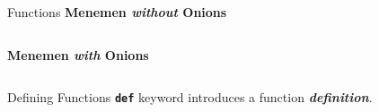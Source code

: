         \begin{frame}[c]{Functions}
            \large
            \textbf{Menemen \textit{without} Onions}
            \normalsize
            \inputminted[firstline=1, lastline=4, frame=single,framesep=2pt]{python3}{code-examples/menemen.py}
            \pause
            \large
            \textbf{Menemen \textit{with} Onions}
            \normalsize
            \inputminted[firstline=6, lastline=11, frame=single,framesep=2pt]{python3}{code-examples/menemen.py}
            \pause
            \begin{center}
            \end{center}
        \end{frame} 

        \begin{frame}{Defining Functions}
            \LARGE
            \textbf{\texttt{def}} keyword introduces a function \textbf{\textit{definition}}.
            \large
            \inputminted[firstline=14, lastline=16, frame=single,framesep=2pt]{python3}{code-examples/menemen.py}
            \inputminted[firstline=18, lastline=20, frame=single,framesep=2pt]{python3}{code-examples/menemen.py}
        \end{frame}

